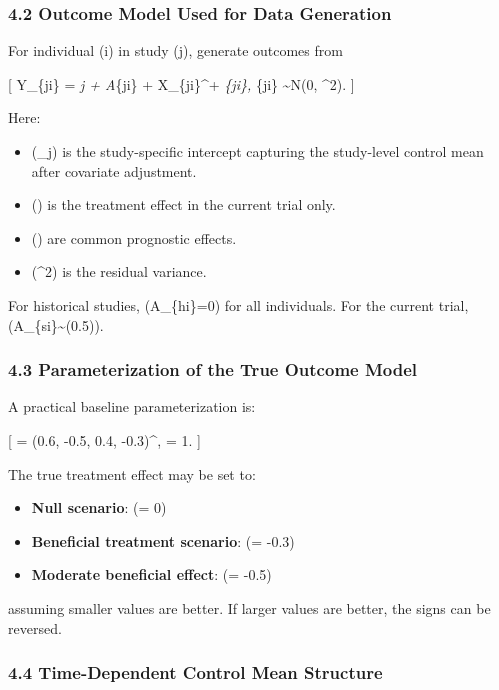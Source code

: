\documentclass[
  letterpaper,
  DIV=11,
  numbers=noendperiod]{scrartcl}
\providecommand{\tightlist}{%
  \setlength{\itemsep}{0pt}\setlength{\parskip}{0pt}}
\begin{document}
\subsubsection{4.2 Outcome Model Used for Data
Generation}\label{outcome-model-used-for-data-generation}

For individual (i) in study (j), generate outcomes from

{[} Y\_\{ji\} = \alpha\emph{j + \tau A}\{ji\} +
X\_\{ji\}\^{}\top \beta + \varepsilon\emph{\{ji\},
\qquad \varepsilon}\{ji\} \sim N(0, \sigma\^{}2). {]}

Here:

\begin{itemize}
\tightlist
\item
  (\alpha\_j) is the study-specific intercept capturing the study-level
  control mean after covariate adjustment.
\item
  (\tau) is the treatment effect in the current trial only.
\item
  (\beta) are common prognostic effects.
\item
  (\sigma\^{}2) is the residual variance.
\end{itemize}

For historical studies, (A\_\{hi\}=0) for all individuals. For the
current trial, (A\_\{si\}\sim {}(0.5)).

\subsubsection{4.3 Parameterization of the True Outcome
Model}\label{parameterization-of-the-true-outcome-model}

A practical baseline parameterization is:

{[} \beta = (0.6, -0.5, 0.4, -0.3)\^{}\top, \qquad \sigma = 1. {]}

The true treatment effect may be set to:

\begin{itemize}
\tightlist
\item
  \textbf{Null scenario}: (\tau = 0)
\item
  \textbf{Beneficial treatment scenario}: (\tau = -0.3)
\item
  \textbf{Moderate beneficial effect}: (\tau = -0.5)
\end{itemize}

assuming smaller values are better. If larger values are better, the
signs can be reversed.

\subsubsection{4.4 Time-Dependent Control Mean
Structure}\label{time-dependent-control-mean-structure}
\end{document}

